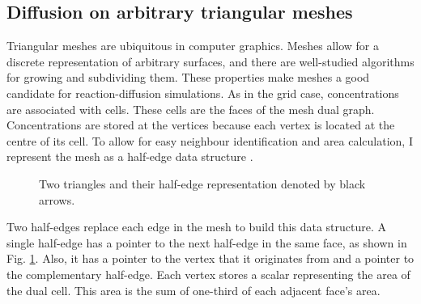 \begin{figure}[H]
\centering
{}
\end{figure}

\subsection{Diffusion on arbitrary triangular meshes}
Triangular meshes are ubiquitous in computer graphics. Meshes allow for a discrete representation of arbitrary surfaces, and there are well-studied algorithms for growing and subdividing them. These properties make meshes a good candidate for reaction-diffusion simulations. As in the grid case, concentrations are associated with cells. These cells are the faces of the mesh dual graph. Concentrations are stored at the vertices because each vertex is located at the centre of its cell. To allow for easy neighbour identification and area calculation, I represent the mesh as a half-edge data structure \citep{marschner2015}.

\begin{figure}[H]
    \centering
    \caption{Two triangles and their half-edge representation denoted by black arrows.}
    \label{fig:halfEdgeMesh}
\end{figure}
Two half-edges replace each edge in the mesh to build this data structure. A single half-edge has a pointer to the next half-edge in the same face, as shown in Fig. \ref{fig:halfEdgeMesh}. Also, it has a pointer to the vertex that it originates from and a pointer to the complementary half-edge. Each vertex stores a scalar representing the area of the dual cell. This area is the sum of one-third of each adjacent face's area. %

